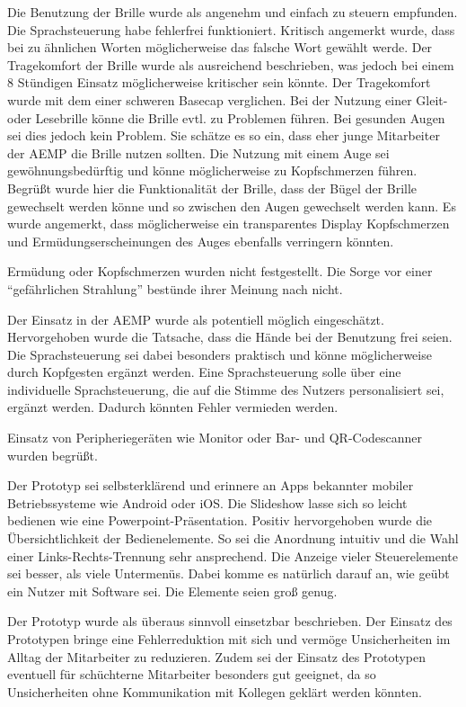 Die Benutzung der Brille wurde als angenehm und einfach zu steuern empfunden. Die Sprachsteuerung habe fehlerfrei funktioniert. Kritisch angemerkt wurde, dass bei zu ähnlichen Worten möglicherweise das falsche Wort gewählt werde. Der Tragekomfort der Brille wurde als ausreichend beschrieben, was jedoch bei einem 8 Stündigen Einsatz möglicherweise kritischer sein könnte. Der Tragekomfort wurde mit dem einer schweren Basecap verglichen. Bei der Nutzung einer Gleit- oder Lesebrille könne die Brille evtl. zu Problemen führen. Bei gesunden Augen sei dies jedoch kein Problem. Sie schätze es so ein, dass eher junge Mitarbeiter der AEMP die Brille nutzen sollten. Die Nutzung mit einem Auge sei gewöhnungsbedürftig und könne möglicherweise zu Kopfschmerzen führen. Begrüßt wurde hier die Funktionalität der Brille, dass der Bügel der Brille gewechselt werden könne und so zwischen den Augen gewechselt werden kann. Es wurde angemerkt, dass möglicherweise ein transparentes Display Kopfschmerzen und Ermüdungserscheinungen des Auges ebenfalls verringern könnten.

Ermüdung oder Kopfschmerzen wurden nicht festgestellt. Die Sorge vor einer \enquote{gefährlichen Strahlung} bestünde ihrer Meinung nach nicht.

Der Einsatz in der AEMP wurde als potentiell möglich eingeschätzt. Hervorgehoben wurde die Tatsache, dass die Hände bei der Benutzung frei seien. Die Sprachsteuerung sei dabei besonders praktisch und könne möglicherweise durch Kopfgesten ergänzt werden. Eine Sprachsteuerung solle über eine individuelle Sprachsteuerung, die auf die Stimme des Nutzers personalisiert sei, ergänzt werden. Dadurch könnten Fehler vermieden werden.

Einsatz von Peripheriegeräten wie Monitor oder Bar- und QR-Codescanner wurden begrüßt.

Der Prototyp sei selbsterklärend und erinnere an Apps bekannter mobiler  Betriebssysteme wie Android oder iOS. Die Slideshow lasse sich so leicht bedienen wie eine Powerpoint-Präsentation. Positiv hervorgehoben wurde die Übersichtlichkeit der Bedienelemente. So sei die Anordnung intuitiv und die Wahl einer Links-Rechts-Trennung sehr ansprechend. Die Anzeige vieler Steuerelemente sei besser, als viele Untermenüs. Dabei komme es natürlich darauf an, wie geübt ein Nutzer mit Software sei. Die Elemente seien groß genug. 

Der Prototyp wurde als überaus sinnvoll einsetzbar beschrieben. Der Einsatz des Prototypen bringe eine Fehlerreduktion mit sich und vermöge Unsicherheiten im Alltag der Mitarbeiter zu reduzieren. Zudem sei der Einsatz des Prototypen eventuell für schüchterne Mitarbeiter besonders gut geeignet, da so Unsicherheiten ohne Kommunikation mit Kollegen geklärt werden könnten.

